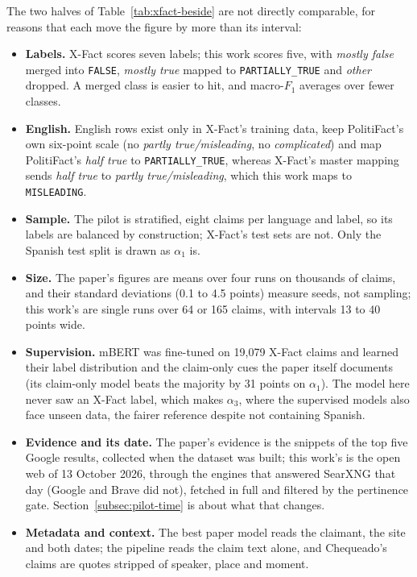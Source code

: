 The two halves of Table~\ref{tab:xfact-beside} are not directly
comparable, for reasons that each move the figure by more than its
interval:

\begin{itemize}
    \item \textbf{Labels.} X-Fact scores seven labels; this work scores
    five, with \emph{mostly false} merged into \texttt{FALSE},
    \emph{mostly true} mapped to \texttt{PARTIALLY\_TRUE} and
    \emph{other} dropped. A merged class is easier to hit, and
    macro-$F_1$ averages over fewer classes.
    \item \textbf{English.} English rows exist only in X-Fact's
    training data, keep PolitiFact's own six-point scale (no
    \emph{partly true/misleading}, no \emph{complicated}) and map
    PolitiFact's \emph{half true} to \texttt{PARTIALLY\_TRUE}, whereas
    X-Fact's master mapping sends \emph{half true} to \emph{partly
    true/misleading}, which this work maps to \texttt{MISLEADING}.
    \item \textbf{Sample.} The pilot is stratified, eight claims per
    language and label, so its labels are balanced by construction;
    X-Fact's test sets are not. Only the Spanish test split is drawn
    as $\alpha_1$ is.
    \item \textbf{Size.} The paper's figures are means over four runs
    on thousands of claims, and their standard deviations (0.1 to 4.5
    points) measure seeds, not sampling; this work's are single runs
    over 64 or 165 claims, with intervals 13 to 40 points wide.
    \item \textbf{Supervision.} mBERT was fine-tuned on 19,079 X-Fact
    claims and learned their label distribution and the claim-only
    cues the paper itself documents (its claim-only model beats the
    majority by 31 points on $\alpha_1$). The model here never saw an
    X-Fact label, which makes $\alpha_3$, where the supervised models
    also face unseen data, the fairer reference despite not containing
    Spanish.
    \item \textbf{Evidence and its date.} The paper's evidence is the
    snippets of the top five Google results, collected when the dataset
    was built; this work's is the open web of 13 October 2026, through
    the engines that answered SearXNG that day (Google and Brave did
    not), fetched in full and filtered by the pertinence gate.
    Section~\ref{subsec:pilot-time} is about what that changes.
    \item \textbf{Metadata and context.} The best paper model reads the
    claimant, the site and both dates; the pipeline reads the claim
    text alone, and Chequeado's claims are quotes stripped of speaker,
    place and moment.
\end{itemize}
